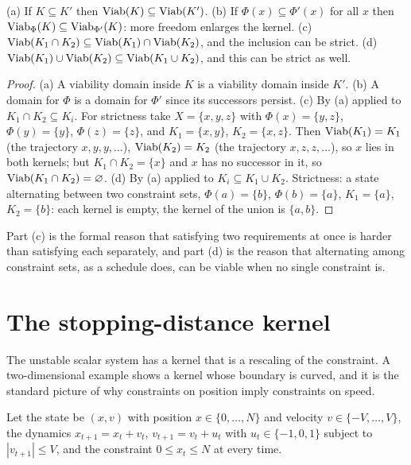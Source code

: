 \begin{newresult}\label{prop:kernel-algebra}
(a) If $K\subseteq K'$ then $\operatorname{Viab}(K)\subseteq\operatorname{Viab}(K')$. (b) If $\Phi(x)\subseteq\Phi'(x)$ for all $x$ then $\operatorname{Viab}_\Phi(K)\subseteq\operatorname{Viab}_{\Phi'}(K)$: more freedom enlarges the kernel. (c) $\operatorname{Viab}(K_1\cap K_2)\subseteq\operatorname{Viab}(K_1)\cap\operatorname{Viab}(K_2)$, and the inclusion can be strict. (d) $\operatorname{Viab}(K_1)\cup\operatorname{Viab}(K_2)\subseteq\operatorname{Viab}(K_1\cup K_2)$, and this can be strict as well.
\end{newresult}
\begin{proof}
(a) A viability domain inside $K$ is a viability domain inside $K'$. (b) A domain for $\Phi$ is a domain for $\Phi'$ since its successors persist. (c) By (a) applied to $K_1\cap K_2\subseteq K_i$. For strictness take $X=\{x,y,z\}$ with $\Phi(x)=\{y,z\}$, $\Phi(y)=\{y\}$, $\Phi(z)=\{z\}$, and $K_1=\{x,y\}$, $K_2=\{x,z\}$. Then $\operatorname{Viab}(K_1)=K_1$ (the trajectory $x,y,y,\dots$), $\operatorname{Viab}(K_2)=K_2$ (the trajectory $x,z,z,\dots$), so $x$ lies in both kernels; but $K_1\cap K_2=\{x\}$ and $x$ has no successor in it, so $\operatorname{Viab}(K_1\cap K_2)=\varnothing$. (d) By (a) applied to $K_i\subseteq K_1\cup K_2$. Strictness: a state alternating between two constraint sets, $\Phi(a)=\{b\}$, $\Phi(b)=\{a\}$, $K_1=\{a\}$, $K_2=\{b\}$: each kernel is empty, the kernel of the union is $\{a,b\}$.
\end{proof}

Part (c) is the formal reason that satisfying two requirements at once is harder than satisfying each separately, and part (d) is the reason that alternating among constraint sets, as a schedule does, can be viable when no single constraint is.

\section{The stopping-distance kernel}\label{sec:stopping}

The unstable scalar system has a kernel that is a rescaling of the constraint. A two-dimensional example shows a kernel whose boundary is curved, and it is the standard picture of why constraints on position imply constraints on speed.

Let the state be $(x,v)$ with position $x\in\{0,\dots,N\}$ and velocity $v\in\{-V,\dots,V\}$, the dynamics $x_{t+1}=x_t+v_t$, $v_{t+1}=v_t+u_t$ with $u_t\in\{-1,0,1\}$ subject to $|v_{t+1}|\le V$, and the constraint $0\le x_t\le N$ at every time.

